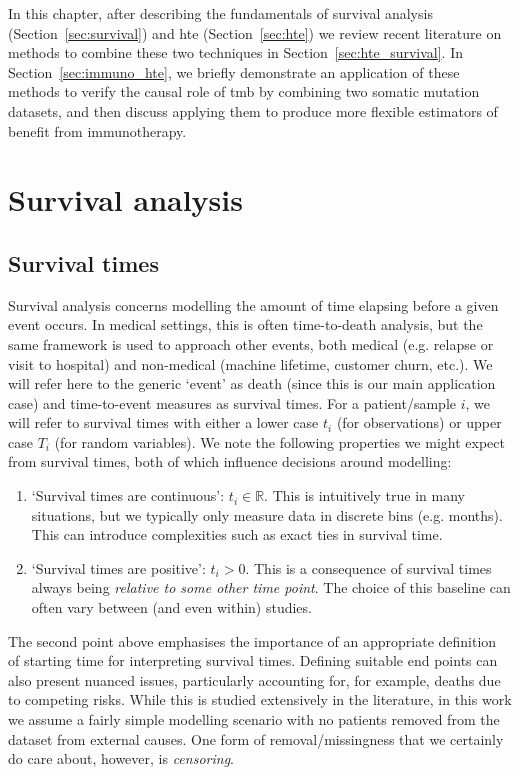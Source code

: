 \documentclass[../thesis.tex]{subfiles}
\begin{document}
In this chapter, after describing the fundamentals of survival analysis (Section~\ref{sec:survival}) and \gls{hte} (Section~\ref{sec:hte}) we review recent literature on methods to combine these two techniques in Section~\ref{sec:hte_survival}. In Section~\ref{sec:immuno_hte}, we briefly demonstrate an application of these methods to verify the causal role of \gls{tmb} by combining two somatic mutation datasets, and then discuss applying them to produce more flexible estimators of benefit from immunotherapy.

\section{Survival analysis \label{sec:survival}}


\subsection{Survival times}
Survival analysis concerns modelling the amount of time elapsing before a given event occurs. In medical settings, this is often time-to-death analysis, but the same framework is used to approach other events, both medical (e.g. relapse or visit to hospital) and non-medical (machine lifetime, customer churn, etc.). We will refer here to the generic `event' as death (since this is our main application case) and time-to-event measures as survival times. For a patient/sample $i$, we will refer to survival times with either a lower case $t_i$ (for observations) or upper case $T_i$ (for random variables). We note the following properties we might expect from survival times, both of which influence decisions around modelling:
\begin{enumerate}
    \item `Survival times are continuous': $t_i \in \mathbb{R}$. This is intuitively true in many situations, but we typically only measure data in discrete bins (e.g. months). This can introduce complexities such as exact ties in survival time.
    \item `Survival times are positive': $t_i > 0$. This is a consequence of survival times always being \emph{relative to some other time point}. The choice of this baseline can often vary between (and even within) studies.
\end{enumerate}
The second point above emphasises the importance of an appropriate definition of starting time for interpreting survival times. Defining suitable end points can also present nuanced issues, particularly accounting for, for example, deaths due to competing risks. While this is studied extensively in the literature, in this work we assume a fairly simple modelling scenario with no patients removed from the dataset from external causes. One form of removal/missingness that we certainly do care about, however, is \emph{censoring}. 
\end{document}
